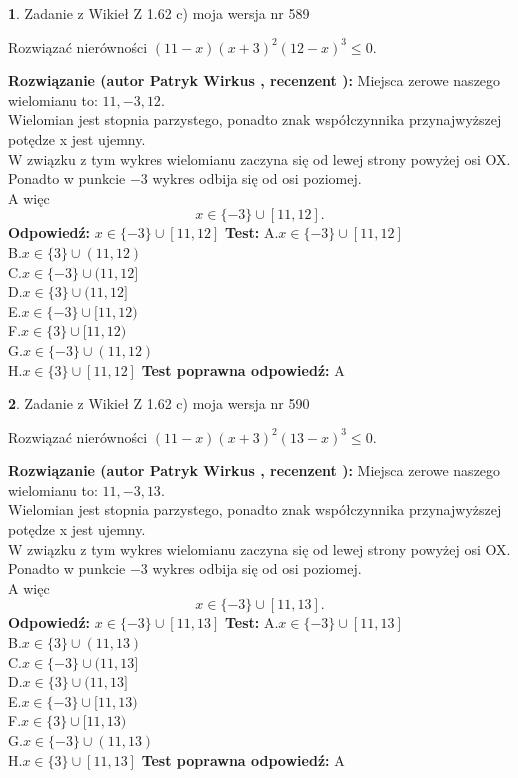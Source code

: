 \documentclass[12pt, a4paper]{article}
\theoremstyle{definition} %
\newtheorem{zad}{}
\newcommand{\zadStart}[1]{\begin{zad}#1\newline}
\newcommand{\zadStop}{\end{zad}}
\newcommand{\rozwStart}[2]{\noindent \textbf{Rozwiązanie (autor #1 , recenzent #2): }\newline}
\newcommand{\rozwStop}{\newline}
\newcommand{\odpStart}{\noindent \textbf{Odpowiedź:}\newline}
\newcommand{\odpStop}{\newline}
\newcommand{\testStart}{\noindent \textbf{Test:}\newline}
\newcommand{\testStop}{\newline}
\newcommand{\kluczStart}{\noindent \textbf{Test poprawna odpowiedź:}\newline}
\newcommand{\kluczStop}{\newline}
\begin{document}
\zadStart{Zadanie z Wikieł Z 1.62 c) moja wersja nr 589}

Rozwiązać nierówności $(11-x)(x+3)^{2}(12-x)^{3}\le0$.
\zadStop
\rozwStart{Patryk Wirkus}{}
Miejsca zerowe naszego wielomianu to: $11, -3, 12$.\\
Wielomian jest stopnia parzystego, ponadto znak współczynnika przy\linebreak najwyższej potędze x jest ujemny.\\ W związku z tym wykres wielomianu zaczyna się od lewej strony powyżej osi OX.\\
Ponadto w punkcie $-3$ wykres odbija się od osi poziomej.\\
A więc $$x \in \{-3\} \cup [11,12].$$
\rozwStop
\odpStart
$x \in \{-3\} \cup [11,12]$
\odpStop
\testStart
A.$x \in \{-3\} \cup [11,12]$\\
B.$x \in \{3\} \cup (11,12)$\\
C.$x \in \{-3\} \cup (11,12]$\\
D.$x \in \{3\} \cup (11,12]$\\
E.$x \in \{-3\} \cup [11,12)$\\
F.$x \in \{3\} \cup [11,12)$\\
G.$x \in \{-3\} \cup (11,12)$\\
H.$x \in \{3\} \cup [11,12]$
\testStop
\kluczStart
A
\kluczStop



\zadStart{Zadanie z Wikieł Z 1.62 c) moja wersja nr 590}

Rozwiązać nierówności $(11-x)(x+3)^{2}(13-x)^{3}\le0$.
\zadStop
\rozwStart{Patryk Wirkus}{}
Miejsca zerowe naszego wielomianu to: $11, -3, 13$.\\
Wielomian jest stopnia parzystego, ponadto znak współczynnika przy\linebreak najwyższej potędze x jest ujemny.\\ W związku z tym wykres wielomianu zaczyna się od lewej strony powyżej osi OX.\\
Ponadto w punkcie $-3$ wykres odbija się od osi poziomej.\\
A więc $$x \in \{-3\} \cup [11,13].$$
\rozwStop
\odpStart
$x \in \{-3\} \cup [11,13]$
\odpStop
\testStart
A.$x \in \{-3\} \cup [11,13]$\\
B.$x \in \{3\} \cup (11,13)$\\
C.$x \in \{-3\} \cup (11,13]$\\
D.$x \in \{3\} \cup (11,13]$\\
E.$x \in \{-3\} \cup [11,13)$\\
F.$x \in \{3\} \cup [11,13)$\\
G.$x \in \{-3\} \cup (11,13)$\\
H.$x \in \{3\} \cup [11,13]$
\testStop
\kluczStart
A
\kluczStop
\end{document}
